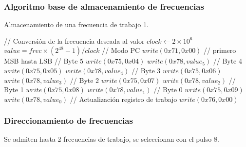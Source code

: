 \subsubsection{Algoritmo base de almacenamiento de frecuencias}
\begin{algorithm}[H]
    \caption{Almacenamiento de una frecuencia de trabajo 1.}\label{algo_frec}
    \begin{algorithmic}[1]
    \State // {Conversi\'on de la frecuencia deseada al valor}
    \State $clock \gets 2 \times 10^{6}$
    \State $value = frec \times (2^{48} -1 ) / clock $
    \State // {Modo PC}
    \State $write(0x71, 0x00)$
    \State // {primero MSB hasta LSB}
    \State // {Byte 5}
    \State $write(0x75, 0x04)$ 
    \State $write(0x78, value_5)$
    \State // {Byte 4}
    \State $write(0x75, 0x05)$ 
    \State $write(0x78, value_4)$
    \State // {Byte 3}
    \State $write(0x75, 0x06)$ 
    \State $write(0x78, value_3)$
    \State // {Byte 2}
    \State $write(0x75, 0x07)$ 
    \State $write(0x78, value_2)$
    \State // {Byte 1}
    \State $write(0x75, 0x08)$ 
    \State $write(0x78, value_1)$
    \State // {Byte 0}
    \State $write(0x75, 0x09)$ 
    \State $write(0x78, value_0)$
    \State // {Actualizaci\'on registro de trabajo}
    \State $write(0x76, 0x00)$
    \EndProcedure
    \end{algorithmic}
\end{algorithm}

\subsubsection{Direccionamiento de frecuencias}
Se admiten hasta 2 frecuencias de trabajo, se seleccionan con el pulso 8.

\newpage
